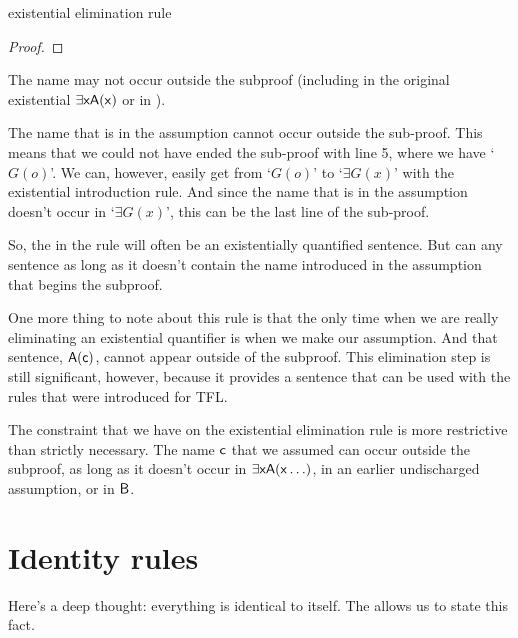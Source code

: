 \begin{factboxy}{existential elimination rule}
\begin{proof}
	\open
		 \as{}
	\close
	 
\end{proof}

\small{The name  may not occur outside the subproof (including in the original existential $\exists \mathsf{x}\mathsf{A}(\mathsf{x})$ or in ).}
\end{factboxy}

The name that is in the assumption cannot occur outside the sub-proof. This means that we could not have ended the sub-proof with line 5, where we have `$G(o)$'. We can, however, easily get from `$G(o)$' to `$\exists G(x)$' with the existential introduction rule. And since the name that is in the assumption doesn't occur in `$\exists G(x)$', this can be the last line of the sub-proof.

So, the  in the rule will often be an existentially quantified sentence. But  can any sentence as long as it doesn't contain the name introduced in the assumption that begins the subproof.

One more thing to note about this rule is that the only time when we are really eliminating an existential quantifier is when we make our assumption. And that sentence, $\mathsf{A(c)}$, cannot appear outside of the subproof. This elimination step is still significant, however, because it provides a sentence that can be used with the rules that were introduced for TFL.

\begin{notebox}
The constraint that we have on the existential elimination rule is more restrictive than strictly necessary. The name $\mathsf{c}$ that we assumed can occur outside the subproof, as long as it doesn't occur in $\exists \mathsf{x}\mathsf{A}(\mathsf{x \ldots})$, in an earlier undischarged assumption, or in $\mathsf{B}$.
\end{notebox}


\section{Identity rules}

Here's a deep thought: everything is identical to itself. The  allows us to state this fact.

